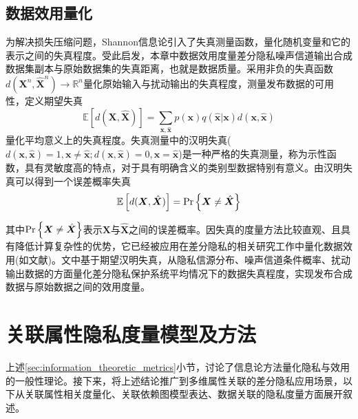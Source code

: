 \subsection{数据效用量化}

为解决损失压缩问题，Shannon信息论引入了失真测量函数，量化随机变量和它的表示之间的失真程度\cite{cover2006elements}。受此启发，本章中数据效用度量差分隐私噪声信道输出合成数据集副本与原始数据集的失真距离，也就是数据质量。采用非负的失真函数$d(\bm{X}^{n},\hat{\bm{X}}^{n})\rightarrow \mathbb{R}^{n}$量化原始输入与扰动输出的失真程度，测量发布数据的可用性，定义期望失真
\begin{equation}\label{eq:chapter03-ED}
\mathbb{E}\left[d(\bm{X},\hat{\bm{X}})\right]=\sum_{\bm{x},\hat{\bm{x}}}p(\bm{x})q(\hat{\bm{x}}|\bm{x})d(\bm{x},\hat{\bm{x}})
\end{equation}
量化平均意义上的失真程度。失真测量中的汉明失真($d(\bm{x},\hat{\bm{x}})=1,\bm{x} \neq \hat{\bm{x}}; d(\bm{x},\hat{\bm{x}})=0, \bm{x}=\hat{\bm{x}}$)是一种严格的失真测量，称为示性函数，具有灵敏度高的特点，对于具有明确含义的类别型数据特别有意义。由汉明失真可以得到一个误差概率失真\cite{cover2006elements}
\begin{equation}\label{eq:expected_hamming_distortion}
	\mathbb{E}\left[d(\bm{X},\hat{\bm{X}})\right]={\rm Pr}\left\{\bm{X} \neq \hat{\bm{X}}\right\}
\end{equation}




其中${\rm Pr}\left\{\bm{X} \neq \hat{\bm{X}}\right\}$表示$\bm{X}$与$\hat{\bm{X}}$之间的误差概率。因失真的度量方法比较直观、且具有降低计算复杂性的优势\cite{oya2017back}，它已经被应用在差分隐私的相关研究工作中量化数据效用(如文献)。文中基于期望汉明失真，从隐私信源分布、噪声信道条件概率、扰动输出数据的方面量化差分隐私保护系统平均情况下的数据失真程度，实现发布合成数据与原始数据之间的效用度量。
\section{关联属性隐私度量模型及方法}
上述\ref{sec:information_theoretic_metrics}小节，讨论了信息论方法量化隐私与效用的一般性理论。接下来，将上述结论推广到多维属性关联的差分隐私应用场景，以下从关联属性相关度量化、关联依赖图模型表达、数据关联的隐私度量方面展开叙述。

